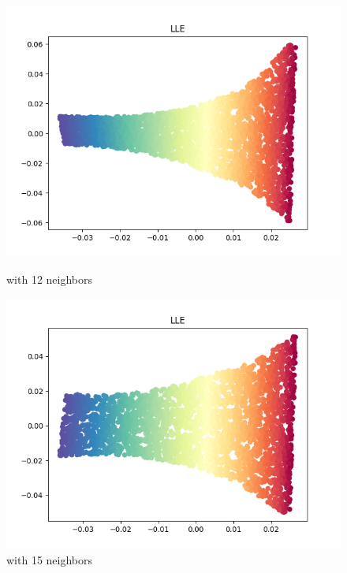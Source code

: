 \documentclass[8pt]{article}
\begin{document}
\begin{figure}[H]
    \hfill
    \begin{minipage}{0.32\textwidth}
        \includegraphics[width=\textwidth]{./Prob1/task2/out/check/task2LLECheck_nei_12.png}
        \caption{with 12 neighbors}
        \label{fig:Swiss Roll after LLE with 12 neighbors}
    \end{minipage}
    \hfill
    \begin{minipage}{0.32\textwidth}
        \includegraphics[width=\textwidth]{./Prob1/task2/out/check/task2LLECheck_nei_15.png}
        \caption{with 15 neighbors}
        \label{fig:Swiss Roll after LLE with 15 neighbors}
    \end{minipage}
    \hfill
    \begin{minipage}{0.32\textwidth}

\end{minipage}
\end{figure}
\end{document}
